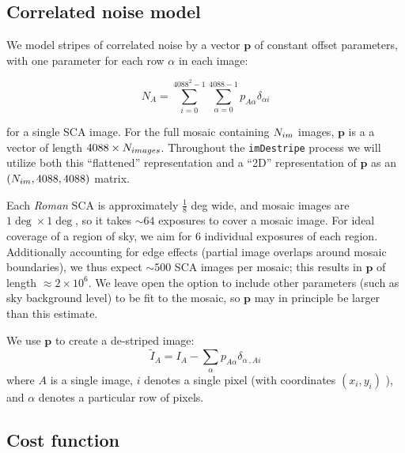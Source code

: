 \documentclass[]{pasj01}
\newcommand{\Chris}[1]{{\textcolor{red}{\bfseries{[#1]}}}}
\begin{document}
\subsection{Correlated noise model}

We model stripes of correlated noise by a vector ${\boldsymbol p}$ of constant offset parameters, with one parameter for each row $\alpha$ in each image:

\begin{equation}
    N_{A} = \sum_{i=0}^{4088^2-1}\sum_{\alpha=0}^{4088-1} p_{A\alpha}\delta_{\alpha i}
\end{equation}

for a single SCA image. For the full mosaic containing $N_{\rm im}$ images, ${\boldsymbol p}$ is a a vector of length $4088\times N_{\rm images}$. Throughout the \texttt{imDestripe} process we will utilize both this ``flattened'' representation and a ``2D'' representation of ${\boldsymbol p}$ as an $(N_{\rm im}, 4088, 4088)$ matrix.

Each \textit{Roman} SCA is approximately $\frac18$ deg wide, and mosaic images are $1\deg\times1\deg$, so it takes $\sim 64$ exposures to cover a mosaic image. For ideal coverage of a region of sky, we aim for 6 individual exposures of each region. Additionally accounting for edge effects (partial image overlaps around mosaic boundaries), we thus expect $\sim500$ SCA images per mosaic; this results in ${\boldsymbol p}$ of length $\approx 2\times10^6$. We leave open the option to include other parameters (such as sky background level) to be fit to the mosaic, so ${\boldsymbol p}$ may in principle be larger than this estimate.

We use ${\boldsymbol p}$ to create a de-striped image: \begin{equation} \label{eq:IAi}
    \tilde{I}_{A} = I_{A} - \sum_{\alpha} p_{A\alpha} \delta_{\alpha\,,Ai} 
\end{equation}
where $A$ is a single image, $i$ denotes a single pixel (with coordinates $(x_i, y_i)$ ), and $\alpha$ denotes a particular row of pixels.

\subsection{Cost function}
\end{document}
